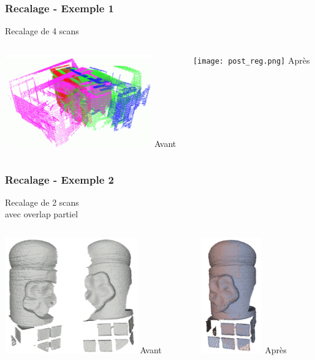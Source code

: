\documentclass{beamer}
\begin{document}
\begin{frame}
\frametitle{Recalage - Exemple 1}
	\center Recalage de 4 scans \footnotesize{\cite{Maka2006}}
	\vspace{5mm}
	\begin{columns}
	\begin{column}[T]{.5\textwidth}
		\includegraphics[height=4cm]{pre_reg.png}
		\center \Large{Avant}
	\end{column}
	\begin{column}[T]{.5\textwidth}
		\texttt{[image: post\_reg.png]}
		\center \Large{Après}
	\end{column}
	\end{columns}
\end{frame}

\begin{frame}
\frametitle{Recalage - Exemple 2}
	\center Recalage de 2 scans { \footnotesize \cite{Mati2011} }
		\\ avec overlap partiel
	\vspace{5mm}
	\begin{columns}
	\begin{column}[T]{.6\textwidth}
		\includegraphics[height=5cm]{pre_reg2.png}
		\center \Large{Avant}
	\end{column}
	\begin{column}[T]{.3\textwidth}
		\includegraphics[height=5cm]{post_reg2.png}
		\center \Large{Après}
	\end{column}
	\end{columns}
\end{frame}
\end{document}

